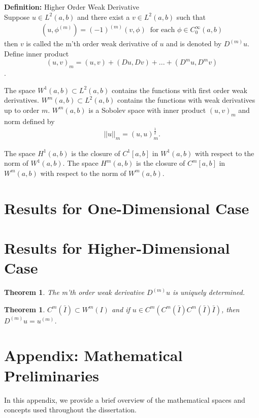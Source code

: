 \documentclass[../../main.tex]{subfiles}
\begin{document}
\textbf{Definition:} Higher Order Weak Derivative\\
Suppose $u \in L^2(a,b)$ and there exist a $v \in L^2(a,b)$ such that
\begin{eqnarray*}
	(u,\phi^{(m)}) = (-1)^{(m)}(v,\phi) \ \textrm{ for each } \phi \in C^{\infty}_0(a,b)
\end{eqnarray*}
then $v$ is called the m'th order weak derivative of $u$ and is denoted by $D^{(m)}u$.\\

Define inner product $$(u,v)_m = (u,v) + (Du,Dv) + ... + (D^mu ,D^mv)$$.

The space $W^1(a,b) \subset L^2(a,b)$ contains the functions with first order weak derivatives. $W^m(a,b)\subset L^2(a,b)$ contains the functions with weak derivatives up to order $m$. $W^m(a,b)$ is a Sobolev space with inner product $(u,v)_m$ and norm defined by 
\begin{eqnarray*}
	||u||_m = (u,u)^{\frac{1}{2}}_m.
\end{eqnarray*}

The space $H^1(a,b)$ is the closure of $C^1[a,b]$ in $W^1(a,b)$ with respect to the norm of $W^1(a,b)$. The space $H^m(a,b)$ is the closure of $C^m[a,b]$ in $W^m(a,b)$ with respect to the norm of $W^m(a,b)$.

\section*{Results for One-Dimensional Case}



\section*{Results for Higher-Dimensional Case}

\newtheorem{thmAH1}{Theorem}
\begin{thmAH1}
	The m'th order weak derivative $D^{(m)}u$ is uniquely determined.
\end{thmAH1}

\newtheorem{thmAH2}{Theorem}
\begin{thmAH2}
	$C^m(\bar{I}) \subset W^m(I)$ and if $u \in C^m(C^m(\bar{I})C^m(\bar{I})\bar{I})$, then $D^{(m)}u = u^{(m)}$. 
\end{thmAH2}

\section*{Appendix: Mathematical Preliminaries}
In this appendix, we provide a brief overview of the mathematical spaces and concepts used throughout the dissertation. 
\end{document}
